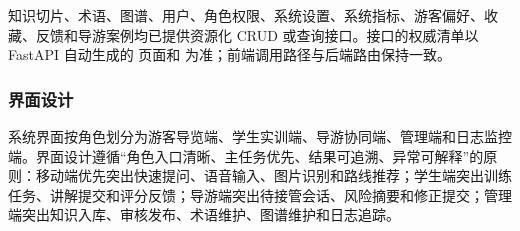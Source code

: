 知识切片、术语、图谱、用户、角色权限、系统设置、系统指标、游客偏好、收藏、反馈和导游案例均已提供资源化 CRUD 或查询接口。接口的权威清单以 FastAPI 自动生成的  页面和  为准；前端调用路径与后端路由保持一致。

\subsubsection{界面设计}

系统界面按角色划分为游客导览端、学生实训端、导游协同端、管理端和日志监控端。界面设计遵循“角色入口清晰、主任务优先、结果可追溯、异常可解释”的原则：移动端优先突出快速提问、语音输入、图片识别和路线推荐；学生端突出训练任务、讲解提交和评分反馈；导游端突出待接管会话、风险摘要和修正提交；管理端突出知识入库、审核发布、术语维护、图谱维护和日志追踪。

